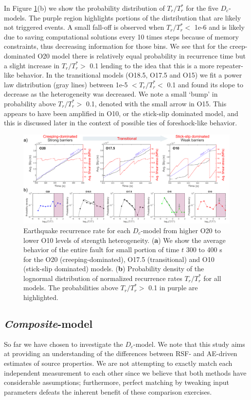 \documentclass[draft]{agujournal2019}
\begin{document}
In Figure \ref{fig11}(b) we show the probability distribution of $T_{r}/T^{*}_{r}$ for the five $D_{c}$-models. The purple region highlights portions of the distribution that are likely not triggered events. A small fall-off is observed when $T_{r}/T^{*}_{r} <$ 1e-6 and is likely due to saving computational solutions every 10 times steps because of memory constraints, thus decreasing information for those bins. We see that for the creep-dominated O20 model there is relatively equal probability in recurrence time but a slight increase in  $T_{r}/T^{*}_{r} >$ 0.1 lending to the idea that this is a more repeater-like behavior. In the transitional models (O18.5, O17.5 and O15) we fit a power law distribution (gray lines) between 1e-5 $< T_{r}/T^{*}_{r} <$ 0.1 and found its slope to decrease as the heterogeneity was decreased. We note a small `bump' in probability above $T_{r}/T^{*}_{r} >$ 0.1, denoted with the small arrow in O15. This appears to have been amplified in O10, or the stick-slip dominated model, and this is discussed later in the context of possible ties of foreshock-like behavior.

\begin{figure}
    	\centering
	\includegraphics[scale = 0.9]{FIG11.pdf} 
	\caption{Earthquake recurrence rate for each $D_{c}$-model from higher O20 to lower O10 levels of strength heterogeneity. (\textbf{a}) We show the average behavior of the entire fault for small portion of time $t$ 300 to 400 s for the O20 (creeping-dominated), O17.5 (transitional) and O10 (stick-slip dominated) models. (\textbf{b}) Probability density of the lognormal distribution of normalized recurrence rates $T_{r}/T^{*}_{r}$ for all models. The probabilities above $T_{r}/T^{*}_{r} >$ 0.1 in purple are highlighted.}
	\label{fig11}
\end{figure}

\subsection{\textit{Composite}-model}
So far we have chosen to investigate the $D_{c}$-model. We note that this study aims at providing an understanding of the differences between RSF- and AE-driven estimates of source properties. We are not attempting to exactly match each independent measurement to each other since we believe that both methods have considerable assumptions; furthermore, perfect matching by tweaking input parameters defeats the inherent benefit of these comparison exercises.
\end{document}
